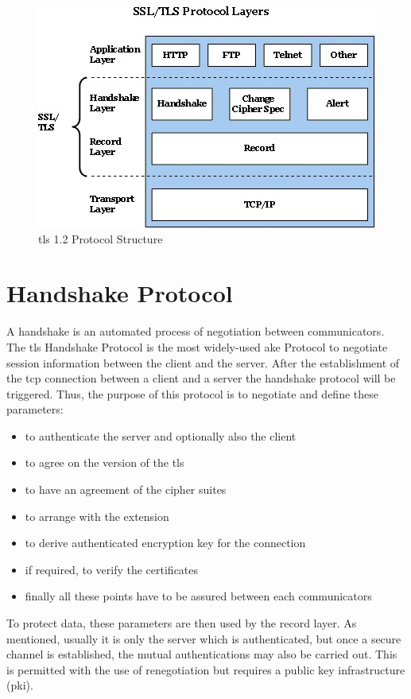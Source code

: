 \begin{figure}[H]
	\centering
		\includegraphics[scale=1]{images/tls_structure.jpg}
	\caption{\gls{tls} 1.2 Protocol Structure \cite{ms:overview}}
	\label{fig:tls_structure}
\end{figure}

\section{Handshake Protocol}
\label{sec:handshake_protocol}
 A handshake is an automated process of negotiation between communicators. The \gls{tls} Handshake Protocol is the most widely-used \gls{ake} Protocol to negotiate session information between the client and the server. 
 After the establishment of the \gls{tcp} connection between a client and a server the handshake protocol will be triggered. 
 Thus, the purpose of this protocol is to negotiate and define these parameters:
 
 \begin{itemize}
\item to authenticate the server and optionally also the client
 \item to agree on the version of the \gls{tls}
 \item to have an agreement of the cipher suites
 \item to arrange with the extension
 \item to derive authenticated encryption key for the connection
 \item if required, to verify the certificates
 \item finally all these points have to be assured between each communicators
\end{itemize}

To protect data, these parameters are then used by the record layer. As mentioned, usually it is only the server which is authenticated, but once a secure channel is established, the mutual authentications may also be carried out. This is permitted with the use of renegotiation but requires a public key infrastructure (\gls{pki}). 
\cite{ms:overview}
\cite{ms:handshake}

